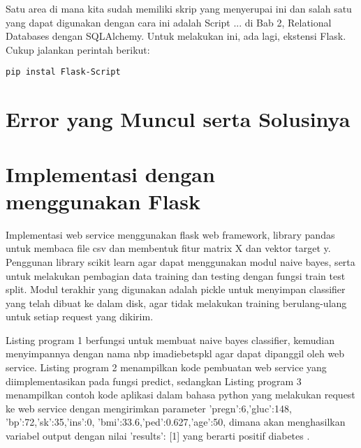 \documentclass[12pt]{article}
\begin{document}
Satu area di mana kita sudah memiliki skrip yang menyerupai ini dan salah satu yang dapat digunakan dengan cara ini adalah Script ... di Bab 2, Relational Databases dengan SQLAlchemy. Untuk melakukan ini, ada lagi, ekstensi Flask. Cukup jalankan perintah berikut:

\begin{verbatim}
pip instal Flask-Script
\end{verbatim}



\section{Error yang Muncul serta Solusinya}



\section{Implementasi dengan menggunakan Flask}
Implementasi web service menggunakan flask web framework, library pandas untuk membaca file csv dan membentuk fitur matrix X dan vektor target y. Penggunan library scikit learn agar dapat menggunakan modul naive bayes, serta untuk melakukan pembagian data training dan testing dengan fungsi train test split. Modul terakhir yang digunakan adalah pickle untuk menyimpan classifier yang telah dibuat ke dalam disk, agar tidak melakukan training berulang-ulang untuk setiap request yang dikirim.

Listing program 1 berfungsi untuk membuat naive bayes classifier, kemudian menyimpannya dengan nama nbp imadiebetspkl agar dapat dipanggil oleh web service. Listing program 2 menampilkan kode pembuatan web service yang diimplementasikan pada fungsi predict, sedangkan Listing program 3 menampilkan contoh kode aplikasi dalam bahasa python yang melakukan request ke web service dengan mengirimkan parameter 'pregn':6,'gluc':148,
'bp':72,'sk':35,'ins':0,
'bmi':33.6,'ped':0.627,'age':50, dimana akan menghasilkan variabel output dengan nilai {'results': [1]} yang berarti positif diabetes \cite{setyawan2017implementasi}.
\end{document}
